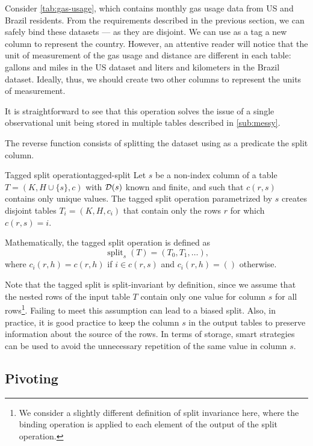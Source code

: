 Consider \cref{tab:gas-usage}, which contains monthly gas usage data from
US and Brazil residents.  From the requirements described in the previous section, we can
safely bind these datasets --- as they are disjoint.  We can use as a tag a new column to
represent the country.  However, an attentive reader will notice that the unit of
measurement of the gas usage and distance are different in each table: gallons and miles
in the US dataset and liters and kilometers in the Brazil dataset.  Ideally, thus, we
should create two other columns to represent the units of measurement.

It is straightforward to see that this operation solves the issue of a single
observational unit being stored in multiple tables described in \cref{sub:messy}.

The reverse function consists of splitting the dataset using as a predicate the split column.

\begin{defbox}{Tagged split operation}{tagged-split}
  Let $s$ be a non-index column of a table $T = (K, H \cup \{s\}, c)$ with $\mathcal{D}\!\left(s\right)$
  known and finite, and such that $c(r, s)$ contains only unique values. The tagged split
  operation parametrized by $s$ creates disjoint tables $T_i = (K, H, c_i)$ that contain
  only the rows $r$ for which $c(r, s) = i$.

  Mathematically, the tagged split operation is defined as \[
    \operatorname{split}_{s}(T) = \left(T_0, T_1, \dots\right)\text{,}
  \] where $c_i(r, h) = c(r, h)$ if $i \in c(r, s)$ and $c_i(r, h) = ()$ otherwise.
\end{defbox}

Note that the tagged split is split-invariant by definition, since we assume that the
nested rows of the input table $T$ contain only one value for column $s$ for all
rows\footnote{We consider a slightly different definition of split invariance here, where
the binding operation is applied to each element of the output of the split operation.}.
Failing to meet this assumption can lead to a biased split.  Also, in practice, it is
good practice to keep the column $s$ in the output tables to preserve information about
the source of the rows.  In terms of storage, smart strategies can be used to avoid the
unnecessary repetition of the same value in column $s$.

\subsection{Pivoting}


